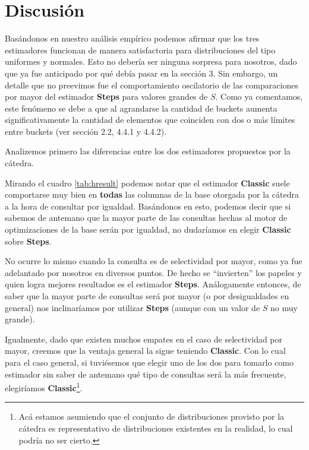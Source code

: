 \section{Discusión}
Basándonos en nuestro análisis empírico podemos afirmar que los tres estimadores funcionan de manera satisfactoria para distribuciones del tipo uniformes y normales. Esto no debería ser ninguna sorpresa para nosotros, dado que ya fue anticipado por qué debía pasar en la sección 3. Sin embargo, un detalle que no preevimos fue el comportamiento oscilatorio de las comparaciones por mayor del estimador \textbf{Steps} para valores grandes de $S$. Como ya comentamos, este fenómeno se debe a que al agrandarse la cantidad de buckets aumenta significativamente la cantidad de elementos que coinciden con dos o más límites entre buckets (ver sección 2.2, 4.4.1 y 4.4.2).

Analizemos primero las diferencias entre los dos estimadores propuestos por la cátedra.

Mirando el cuadro \ref{tab:hresult} podemos notar que el estimador \textbf{Classic} suele comportarse muy bien en \textbf{todas} las columnas de la base otorgada por la cátedra a la hora de consultar por igualdad. Basándonos en esto, podemos decir que si sabemos de antemano que la mayor parte de las consultas hechas al motor de optimizaciones de la base serán por igualdad, no dudaríamos en elegir \textbf{Classic} sobre \textbf{Steps}.

No ocurre lo mismo cuando la consulta es de selectividad por mayor, como ya fue adelantado por nosotros en diversos puntos. De hecho se ``invierten'' los papeles y quien logra mejores resultados es el estimador \textbf{Steps}. Análogamente entonces, de saber que la mayor parte de consultas será por mayor (o por desigualdades en general) nos inclinaríamos por utilizar \textbf{Steps} (aunque con un valor de $S$ no muy grande).

Igualmente, dado que existen muchos empates en el caso de selectividad por mayor, creemos que la ventaja general la sigue teniendo \textbf{Classic}. Con lo cual para el caso general, si tuviésemos que elegir uno de los dos para tomarlo como estimador sin saber de antemano qué tipo de consultas será la más frecuente, elegiríamos \textbf{Classic}\footnote{Acá estamos asumiendo que el conjunto de distribuciones provisto por la cátedra es representativo de distribuciones existentes en la realidad, lo cual podría no ser cierto.}.

